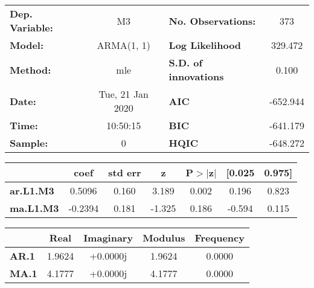 \begin{center}
\begin{tabular}{lclc}
\toprule
\textbf{Dep. Variable:} &             M3            & \textbf{  No. Observations:  } &            373             \\
\textbf{Model:}         &         ARMA(1, 1)        & \textbf{  Log Likelihood     } &          329.472           \\
\textbf{Method:}        &            mle            & \textbf{  S.D. of innovations} &           0.100            \\
\textbf{Date:}          &      Tue, 21 Jan 2020     & \textbf{  AIC                } &          -652.944          \\
\textbf{Time:}          &          10:50:15         & \textbf{  BIC                } &          -641.179          \\
\textbf{Sample:}        &             0             & \textbf{  HQIC               } &          -648.272          \\
\bottomrule
\end{tabular}
\begin{tabular}{lcccccc}
                  & \textbf{coef} & \textbf{std err} & \textbf{z} & \textbf{P$>$$|$z$|$} & \textbf{[0.025} & \textbf{0.975]}  \\
\midrule
\textbf{ar.L1.M3} &       0.5096  &        0.160     &     3.189  &         0.002        &        0.196    &        0.823     \\
\textbf{ma.L1.M3} &      -0.2394  &        0.181     &    -1.325  &         0.186        &       -0.594    &        0.115     \\
\bottomrule
\end{tabular}
\begin{tabular}{lcccc}
              & \textbf{            Real} & \textbf{         Imaginary} & \textbf{         Modulus} & \textbf{        Frequency}  \\
\midrule
\textbf{AR.1} &                1.9624     &                +0.0000j     &                1.9624     &                0.0000       \\
\textbf{MA.1} &                4.1777     &                +0.0000j     &                4.1777     &                0.0000       \\
\bottomrule
\end{tabular}
\end{center}